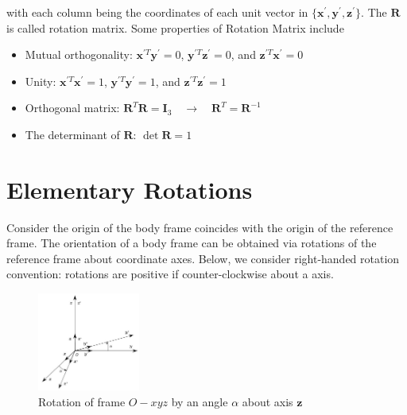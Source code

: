 \documentclass[10pt]{article}
\begin{document}
with each column being  the coordinates of each unit vector in $\{\boldsymbol{x}^{\prime}, \boldsymbol{y}^{\prime}, \boldsymbol{z}^{\prime}\}$. The  $\boldsymbol{R}$ is called rotation matrix. Some properties of Rotation Matrix include
\begin{itemize}
    \item Mutual orthogonality:
    $
\boldsymbol{x}^{\prime T} \boldsymbol{y}^{\prime}=0$, $\boldsymbol{y}^{\prime T} \boldsymbol{z}^{\prime}=0$, and $\boldsymbol{z}^{\prime T} \boldsymbol{x}^{\prime}=0$

    \item Unity: $\boldsymbol{x}^{\prime T} \boldsymbol{x}^{\prime}=1$, $\boldsymbol{y}^{\prime T} \boldsymbol{y}^{\prime}=1$, and $\boldsymbol{z}^{\prime T} \boldsymbol{z}^{\prime}=1$

 \item Orthogonal matrix: $\boldsymbol{R}^{T} \boldsymbol{R}=\boldsymbol{I}_{3} \quad \rightarrow \quad \boldsymbol{R}^{T}=\boldsymbol{R}^{-1}$

 \item The determinant of $\boldsymbol{R}$: $\det \boldsymbol{R}=1$


\end{itemize}



\section{Elementary Rotations}
Consider the origin of the body frame coincides with the origin of the reference frame. The orientation of a body frame can be obtained via  rotations of the reference frame about coordinate axes. Below, we consider right-handed rotation convention:  rotations are positive if counter-clockwise about a axis. 


\begin{figure}[h]
    \centering
    \includegraphics[max width=0.3\textwidth]{./kinematics/elementary_rotations}
    \caption{ Rotation of frame $O- x y z$ by an angle $\alpha$ about axis $\boldsymbol{z}$}
    \label{c1.rotation1}
\end{figure}
\end{document}
